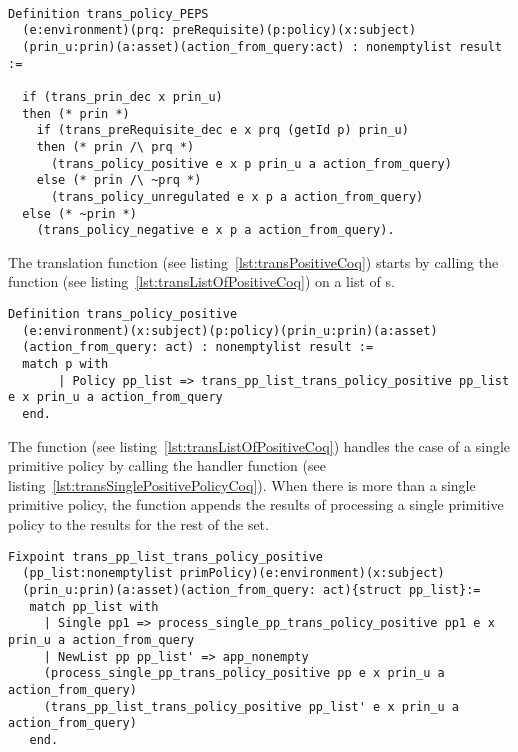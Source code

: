 \begin{minipage}{\linewidth}
\begin{lstlisting}

Definition trans_policy_PEPS
  (e:environment)(prq: preRequisite)(p:policy)(x:subject)
  (prin_u:prin)(a:asset)(action_from_query:act) : nonemptylist result :=
  
  if (trans_prin_dec x prin_u)
  then (* prin *)
    if (trans_preRequisite_dec e x prq (getId p) prin_u)
    then (* prin /\ prq *)
      (trans_policy_positive e x p prin_u a action_from_query)
    else (* prin /\ ~prq *)
      (trans_policy_unregulated e x p a action_from_query)
  else (* ~prin *)
    (trans_policy_negative e x p a action_from_query).

\end{lstlisting}
\end{minipage}


\newpage

The  translation function (see listing~\ref{lst:transPositiveCoq}) starts by calling the function  (see listing~\ref{lst:transListOfPositiveCoq}) on a list of s.
 
\begin{minipage}{\linewidth}
\begin{lstlisting}
Definition trans_policy_positive
  (e:environment)(x:subject)(p:policy)(prin_u:prin)(a:asset)
  (action_from_query: act) : nonemptylist result :=
  match p with
       | Policy pp_list => trans_pp_list_trans_policy_positive pp_list e x prin_u a action_from_query
  end.
\end{lstlisting}
\end{minipage}

The function  (see listing~\ref{lst:transListOfPositiveCoq}) handles the case of a single primitive policy by calling the handler function  (see listing~\ref{lst:transSinglePositivePolicyCoq}). When there is more than a single primitive policy, the function  appends the results of processing a single primitive policy to the results for the rest of the set.

\begin{lstlisting}
Fixpoint trans_pp_list_trans_policy_positive
  (pp_list:nonemptylist primPolicy)(e:environment)(x:subject)
  (prin_u:prin)(a:asset)(action_from_query: act){struct pp_list}:=
   match pp_list with
     | Single pp1 => process_single_pp_trans_policy_positive pp1 e x prin_u a action_from_query
     | NewList pp pp_list' => app_nonempty
	 (process_single_pp_trans_policy_positive pp e x prin_u a action_from_query) 
	 (trans_pp_list_trans_policy_positive pp_list' e x prin_u a action_from_query)
   end.
\end{lstlisting}


